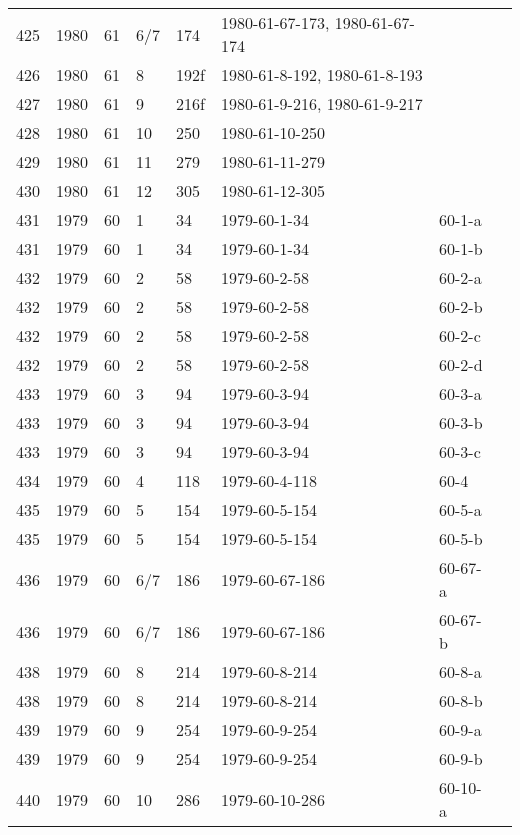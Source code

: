 \begin{longtable}{ |l|l|l|l|l|l|l|l| }
425 & 1980 & 61 &   6/7 &     174 & 1980-61-67-173, 1980-61-67-174 &  & \\
426 & 1980 & 61 &     8 &    192f & 1980-61-8-192, 1980-61-8-193 &  & \\
427 & 1980 & 61 &     9 &    216f & 1980-61-9-216, 1980-61-9-217 &  & \\
428 & 1980 & 61 &    10 &     250 & 1980-61-10-250 &  & \\
429 & 1980 & 61 &    11 &     279 & 1980-61-11-279 &  & \\
430 & 1980 & 61 &    12 &     305 & 1980-61-12-305 &  & \\
431 & 1979 & 60 &     1 &      34 & 1979-60-1-34   & 60-1-a & \\
431 & 1979 & 60 &     1 &      34 & 1979-60-1-34   & 60-1-b & \\
432 & 1979 & 60 &     2 &      58 & 1979-60-2-58   & 60-2-a & \\
432 & 1979 & 60 &     2 &      58 & 1979-60-2-58   & 60-2-b & \\
432 & 1979 & 60 &     2 &      58 & 1979-60-2-58   & 60-2-c & \\
432 & 1979 & 60 &     2 &      58 & 1979-60-2-58   & 60-2-d & \\
433 & 1979 & 60 &     3 &      94 & 1979-60-3-94   & 60-3-a & \\
433 & 1979 & 60 &     3 &      94 & 1979-60-3-94   & 60-3-b & \\
433 & 1979 & 60 &     3 &      94 & 1979-60-3-94   & 60-3-c & \\
434 & 1979 & 60 &     4 &     118 & 1979-60-4-118  & 60-4 & \\
435 & 1979 & 60 &     5 &     154 & 1979-60-5-154  & 60-5-a & \\
435 & 1979 & 60 &     5 &     154 & 1979-60-5-154  & 60-5-b & \\
436 & 1979 & 60 &   6/7 &     186 & 1979-60-67-186 & 60-67-a & \\
436 & 1979 & 60 &   6/7 &     186 & 1979-60-67-186 & 60-67-b & \\
438 & 1979 & 60 &     8 &     214 & 1979-60-8-214  & 60-8-a & \\
438 & 1979 & 60 &     8 &     214 & 1979-60-8-214  & 60-8-b & \\
439 & 1979 & 60 &     9 &     254 & 1979-60-9-254  & 60-9-a & \\
439 & 1979 & 60 &     9 &     254 & 1979-60-9-254  & 60-9-b & \\
440 & 1979 & 60 &    10 &     286 & 1979-60-10-286 & 60-10-a & \\

\end{longtable}
